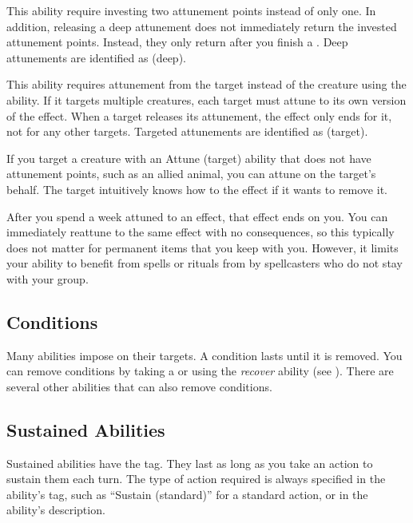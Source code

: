      This ability require investing two attunement points instead of only one.
    In addition, releasing a deep attunement does not immediately return the invested attunement points.
    Instead, they only return after you finish a .
    Deep attunements are identified as  (deep).

     This ability requires attunement from the target instead of the creature using the ability.
    If it targets multiple creatures, each target must attune to its own version of the effect.
    When a target releases its attunement, the effect only ends for it, not for any other targets.
    Targeted attunements are identified as  (target).

    If you target a creature with an Attune (target) ability that does not have attunement points, such as an allied animal, you can attune on the target's behalf.
    The target intuitively knows how to  the effect if it wants to remove it.

     After you spend a week attuned to an effect, that effect ends on you.
    You can immediately reattune to the same effect with no consequences, so this typically does not matter for permanent items that you keep with you.
    However, it limits your ability to benefit from spells or rituals from by spellcasters who do not stay with your group.

  \subsection{Conditions}\label{Conditions}
    Many abilities impose  on their targets.
    A condition lasts until it is removed.
    You can remove conditions by taking a  or using the \textit{recover} ability (see ).
    There are several other abilities that can also remove conditions.

  \subsection{Sustained Abilities}\label{Sustained Abilities}
    Sustained abilities have the  tag.
    They last as long as you take an action to sustain them each turn.
    The type of action required is always specified in the ability's tag, such as ``Sustain (standard)'' for a standard action, or in the ability's description.


